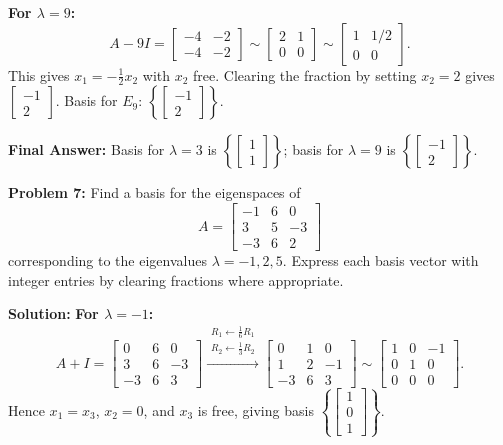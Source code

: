 \documentclass[11pt, letterpaper]{article}
\theoremstyle{definition}
\theoremstyle{remark}
\begin{document}
\textbf{For $\lambda = 9$:}
\[
A - 9I = \begin{bmatrix} -4 & -2 \\ -4 & -2 \end{bmatrix} \sim \begin{bmatrix} 2 & 1 \\ 0 & 0 \end{bmatrix} \sim \begin{bmatrix} 1 & 1/2 \\ 0 & 0 \end{bmatrix}.
\]
This gives $x_1 = -\frac{1}{2}x_2$ with $x_2$ free. Clearing the fraction by setting $x_2 = 2$ gives $\begin{bmatrix} -1 \\ 2 \end{bmatrix}$. Basis for $E_9$: $\left\{ \begin{bmatrix} -1 \\ 2 \end{bmatrix} \right\}$.

\textbf{Final Answer:} Basis for $\lambda = 3$ is $\left\{ \begin{bmatrix} 1 \\ 1 \end{bmatrix} \right\}$; basis for $\lambda = 9$ is $\left\{ \begin{bmatrix} -1 \\ 2 \end{bmatrix} \right\}$.

\vspace{0.4em}
\textbf{Problem 7:}
Find a basis for the eigenspaces of
\[
A = \begin{bmatrix} -1 & 6 & 0 \\ 3 & 5 & -3 \\ -3 & 6 & 2 \end{bmatrix}
\]
corresponding to the eigenvalues $\lambda = -1, 2, 5$. Express each basis vector with integer entries by clearing fractions where appropriate.

\textbf{Solution:}
\textbf{For $\lambda = -1$:}
\[
A + I = \begin{bmatrix} 0 & 6 & 0 \\ 3 & 6 & -3 \\ -3 & 6 & 3 \end{bmatrix}
\xrightarrow{\substack{R_1 \leftarrow \frac{1}{6}R_1 \\ R_2 \leftarrow \frac{1}{3}R_2}}
\begin{bmatrix} 0 & 1 & 0 \\ 1 & 2 & -1 \\ -3 & 6 & 3 \end{bmatrix}
\sim
\begin{bmatrix} 1 & 0 & -1 \\ 0 & 1 & 0 \\ 0 & 0 & 0 \end{bmatrix}.
\]
Hence $x_1 = x_3$, $x_2 = 0$, and $x_3$ is free, giving basis $\left\{ \begin{bmatrix} 1 \\ 0 \\ 1 \end{bmatrix} \right\}$.
\end{document}
